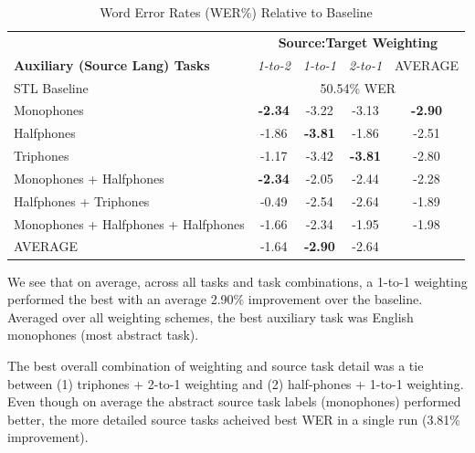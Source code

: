 \documentclass[a4paper]{article}
\begin{document}
\begin{table}[!htbp]
  \centering
  \caption{Word Error Rates (WER\%) Relative to Baseline}
    \label{tab:results}
  \begin{adjustbox}{width=.45\textwidth}
    \begin{tabular}{lcccc}
      \toprule
      & \multicolumn{4}{c}{\textbf{Source:Target Weighting}} \\
      \textbf{Auxiliary (Source Lang) Tasks} & \textit{1-to-2} & \textit{1-to-1} & \textit{2-to-1} & AVERAGE\\
      \midrule
      STL Baseline                          &               \multicolumn{4}{c}{50.54\% WER}  \\
      Monophones                            & \textbf{-2.34}  & -3.22           & -3.13           & \textbf{-2.90}\\
      Halfphones                            & -1.86           & \textbf{-3.81}  & -1.86           & -2.51\\
      Triphones                             & -1.17           & -3.42           & \textbf{-3.81}  & -2.80\\
      Monophones + Halfphones               & \textbf{-2.34}  & -2.05           & -2.44           & -2.28\\
      Halfphones + Triphones                & -0.49           & -2.54           & -2.64           & -1.89\\
      Monophones + Halfphones + Halfphones  & -1.66           & -2.34           & -1.95           & -1.98\\
      \midrule
      AVERAGE                               & -1.64           & \textbf{-2.90}  & -2.64           & \\
      \bottomrule
    \end{tabular}
  \end{adjustbox}
\end{table}

We see that on average, across all tasks and task combinations, a 1-to-1 weighting performed the best with an average 2.90\% improvement over the baseline. Averaged over all weighting schemes, the best auxiliary task was English monophones (most abstract task).

The best overall combination of weighting and source task detail was a tie between (1) triphones + 2-to-1 weighting and (2) half-phones + 1-to-1 weighting. Even though on average the abstract source task labels (monophones) performed better, the more detailed source tasks acheived best WER in a single run (3.81\% improvement).
\end{document}
